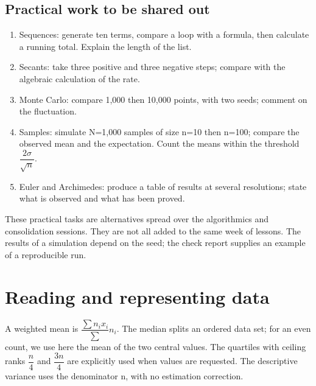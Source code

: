 \subsection*{Practical work to be shared out}\label{TP}
\begin{enumerate}
\item Sequences: generate ten terms, compare a loop with a formula, then calculate a running total. Explain the length of the list.
\item Secants: take three positive and three negative steps; compare with the algebraic calculation of the rate.
\item Monte Carlo: compare 1,000 then 10,000 points, with two seeds; comment on the fluctuation.
\item Samples: simulate N=1,000 samples of size n=10 then n=100; compare the observed mean and the expectation. Count the means within the threshold $\dfrac{2\sigma}{\sqrt n}$.
\item Euler and Archimedes: produce a table of results at several resolutions; state what is observed and what has been proved.
\end{enumerate}
These practical tasks are alternatives spread over the algorithmics and consolidation sessions. They are not all added to the same week of lessons. The results of a simulation depend on the seed; the check report supplies an example of a reproducible run.

\section{Reading and representing data}\label{STATS}
A weighted mean is $\dfrac{\sum n_ix_i}{\sum}n_i$. The median splits an ordered data set; for an even count, we use here the mean of the two central values. The quartiles with ceiling ranks $\dfrac{n}{4}$ and $\dfrac{3n}{4}$ are explicitly used when values are requested. The descriptive variance uses the denominator n, with no estimation correction.


